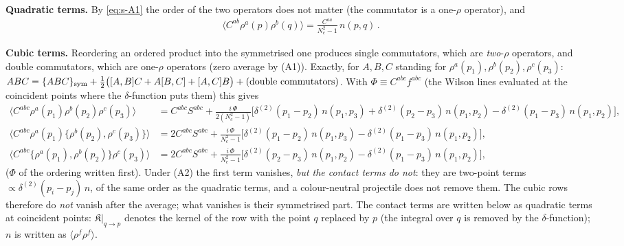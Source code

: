 \noindent\textbf{Quadratic terms.} By \eqref{eq:s-A1} the order of the two operators does not matter (the commutator is a one-$\rho$ operator), and
\begin{align}
\langle C^{ab}\rho^{a}(p)\rho^{b}(q)\rangle=\frac{C^{aa}}{N_{c}^{2}-1}\,n(p,q)\,.\label{eq:s-quad}
\end{align}

\noindent\textbf{Cubic terms.} Reordering an ordered product into the symmetrised one produces single commutators, which are \emph{two}-$\rho$ operators, and double commutators, which are one-$\rho$ operators (zero average by (A1)). Exactly, for $A,B,C$ standing for $\rho^{a}(p_{1}),\rho^{b}(p_{2}),\rho^{c}(p_{3})$: $ABC=\{ABC\}_{\rm sym}+\frac12\big([A,B]C+A[B,C]+[A,C]B\big)+(\text{double commutators})$. With $\Phi\equiv C^{abc}f^{abc}$ (the Wilson lines evaluated at the coincident points where the $\delta$-function puts them) this gives
\begin{align}
\langle C^{abc}\rho^{a}(p_{1})\rho^{b}(p_{2})\rho^{c}(p_{3})\rangle&=C^{abc}S^{abc}+\frac{i\,\Phi}{2(N_{c}^{2}-1)}\Big[\delta^{(2)}(p_{1}-p_{2})\,n(p_{1},p_{3})+\delta^{(2)}(p_{2}-p_{3})\,n(p_{1},p_{2})-\delta^{(2)}(p_{1}-p_{3})\,n(p_{1},p_{2})\Big],\label{eq:s-ord}\\
\langle C^{abc}\rho^{a}(p_{1})\{\rho^{b}(p_{2}),\rho^{c}(p_{3})\}\rangle&=2C^{abc}S^{abc}+\frac{i\,\Phi}{N_{c}^{2}-1}\Big[\delta^{(2)}(p_{1}-p_{2})\,n(p_{1},p_{3})-\delta^{(2)}(p_{1}-p_{3})\,n(p_{1},p_{2})\Big],\label{eq:s-a23}\\
\langle C^{abc}\{\rho^{a}(p_{1}),\rho^{b}(p_{2})\}\rho^{c}(p_{3})\rangle&=2C^{abc}S^{abc}+\frac{i\,\Phi}{N_{c}^{2}-1}\Big[\delta^{(2)}(p_{2}-p_{3})\,n(p_{1},p_{2})-\delta^{(2)}(p_{1}-p_{3})\,n(p_{1},p_{2})\Big],\label{eq:s-a12}
\end{align}
($\Phi$ of the ordering written first). Under (A2) the first term vanishes, \emph{but the contact terms do not}: they are two-point terms $\propto\delta^{(2)}(p_{i}-p_{j})\,n$, of the same order as the quadratic terms, and a colour-neutral projectile does not remove them. The cubic rows therefore do \emph{not} vanish after the average; what vanishes is their symmetrised part. The contact terms are written below as quadratic terms at coincident points: $\mathfrak{K}\big|_{q\to p}$ denotes the kernel of the row with the point $q$ replaced by $p$ (the integral over $q$ is removed by the $\delta$-function); $n$ is written as $\langle\rho^{f}\rho^{f}\rangle$.

